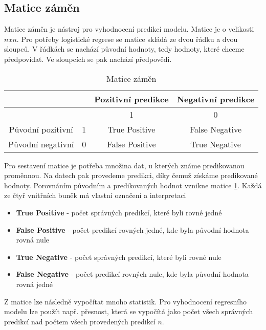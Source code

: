 \newpage
{\color{red}
\subsection{Matice záměn}
Matice záměn je nástroj pro vyhodnocení predikcí modelu. Matice je o velikosti $n x n$. Pro potřeby logistické regrese se matice skládá ze dvou řádku a dvou sloupců.
V řádkách se nachází původní hodnoty, tedy hodnoty, které chceme předpovídat. Ve sloupcích se pak nachází předpovědi.  

\begin{table}[H]
    \centering
    \begin{tabular}{|c|c|c|c|}
        \hline
                        &   & Pozitivní predikce & Negativní predikce \\ \hline
                        &   & 1                  & 0                  \\ \hline
        Původní pozitivní & 1 & True Positive      & False Negative     \\ \hline
        Původní negativní & 0 & False Positive     & True Negative      \\ \hline
    \end{tabular}
    \caption{\label{tab:matice_zamen}Matice záměn}
\end{table}

Pro sestavení matice je potřeba množina dat, u kterých známe predikovanou proměnnou. Na datech pak provedeme predikci, díky čemuž získáme predikované hodnoty. Porovnáním
původním a predikovaných hodnot vznikne matice \ref{tab:matice_zamen}. Každá ze čtyř vnitřních buněk má vlastní označení a interpretaci

\begin{itemize}
    \item \textbf{True Positive} - počet správných predikcí, které byli rovné jedné
    \item \textbf{False Positive} - počet predikcí rovných jedné, kde byla původní hodnota rovná nule
    \item \textbf{True Negative} - počet správných predikcí, které byli rovné nule
    \item \textbf{False Negative} - počet predikcí rovných nule, kde byla původní hodnota rovná jedné
\end{itemize}

Z matice lze následně vypočítat mnoho statistik. Pro vyhodnocení regresního modelu lze použít např. přesnost, která se vypočítá jako počet všech správných predikcí nad
počtem všech provedených predikcí $n$.

}

